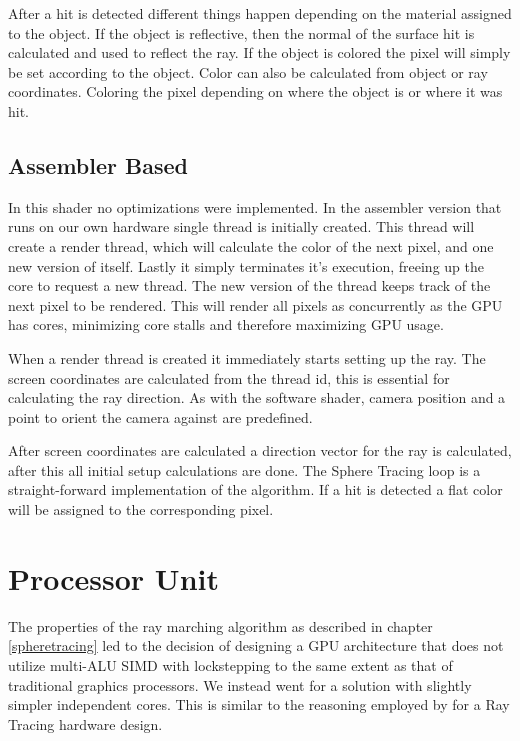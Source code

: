 			After a hit is detected different things happen depending on the material
			assigned to the object. If the object is reflective, then the normal of the
			surface hit is calculated and used to reflect the ray. If the object is
			colored the pixel will simply be set according to the object. Color can
			also be calculated from object or ray coordinates. Coloring the pixel
			depending on where the object is or where it was hit.

		\subsection{Assembler Based}

			In this shader no optimizations were implemented. In the assembler 
			version that runs on our own hardware single thread is initially 
			created. This thread will create a render thread, which will 
			calculate the color of the next pixel, and one new version of
            itself. Lastly it simply terminates it's execution, freeing up the 
            core to request a new thread. The new version of the thread keeps 
            track of the next pixel to be rendered. This will render all pixels 
            as concurrently as the GPU has cores, minimizing core stalls and 
            therefore maximizing GPU usage.

			When a render thread is created it immediately starts setting up the
			ray. The screen coordinates are calculated from the thread id, this 
			is essential for calculating the ray direction. As with the software
			shader, camera position and a point	to orient the camera against are 
			predefined. 

			After screen coordinates are calculated a direction vector for the 
			ray is calculated, after this all initial setup calculations are 
			done. The Sphere Tracing loop is a straight-forward implementation 
			of the algorithm. If a hit is detected a flat color will be assigned
			to the corresponding pixel.

	\section{Processor Unit} \label{implproc}

		The properties of the ray marching algorithm as described in chapter
		\ref{spheretracing} led to the decision of designing a GPU architecture
		that does not utilize multi-ALU SIMD with lockstepping to the same extent
		as that of traditional graphics processors. We instead went for a solution
		with slightly simpler independent cores. This is similar to the reasoning
		employed by \cite{Woop2005} for a Ray Tracing hardware design.

